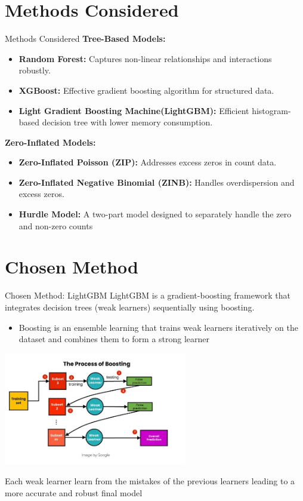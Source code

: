 \documentclass{beamer}\usepackage[]{graphicx}\usepackage[]{xcolor}
\begin{document}
\section{Methods Considered}

\begin{frame}{Methods Considered}
\textbf{Tree-Based Models:}
\begin{itemize}
    \item \textbf{Random Forest:} Captures non-linear relationships and interactions robustly.
    \item \textbf{XGBoost:} Effective gradient boosting algorithm for structured data.
    \item \textbf{Light Gradient Boosting Machine(LightGBM):} Efficient histogram-based decision tree with lower memory consumption.
\end{itemize}

\textbf{Zero-Inflated Models:}
\begin{itemize}
    \item \textbf{Zero-Inflated Poisson (ZIP):} Addresses excess zeros in count data.
    \item \textbf{Zero-Inflated Negative Binomial (ZINB):} Handles overdispersion and excess zeros.
    \item \textbf{Hurdle Model:} A two-part model designed to separately handle the zero and non-zero counts
\end{itemize}
\end{frame}

\section{Chosen Method}

\begin{frame}{Chosen Method: LightGBM}
LightGBM is a gradient-boosting framework that integrates decision trees (weak learners) sequentially using boosting.
\begin{itemize}
    \item Boosting is an ensemble learning that trains weak learners iteratively on the dataset and combines them to form a strong learner
\end{itemize}
\begin{center}
    \includegraphics[width=0.6\textwidth]{Boosting.jpg}
\end{center}
\vspace{-0.2cm}
\footnotesize{Each weak learner learn from the mistakes of the previous learners leading to a more accurate and robust final model}
\end{frame}
\end{document}
